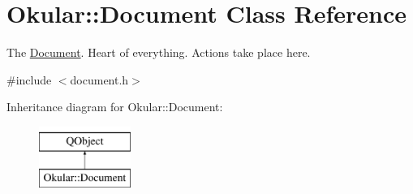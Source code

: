 \hypertarget{classOkular_1_1Document}{\section{Okular\+:\+:Document Class Reference}
\label{classOkular_1_1Document}
}


The \hyperlink{classOkular_1_1Document}{Document}. Heart of everything. Actions take place here.  




{\ttfamily \#include $<$document.\+h$>$}

Inheritance diagram for Okular\+:\+:Document\+:\begin{figure}[H]
\begin{center}
\leavevmode
\includegraphics[height=2.000000cm]{classOkular_1_1Document}
\end{center}
\end{figure}
